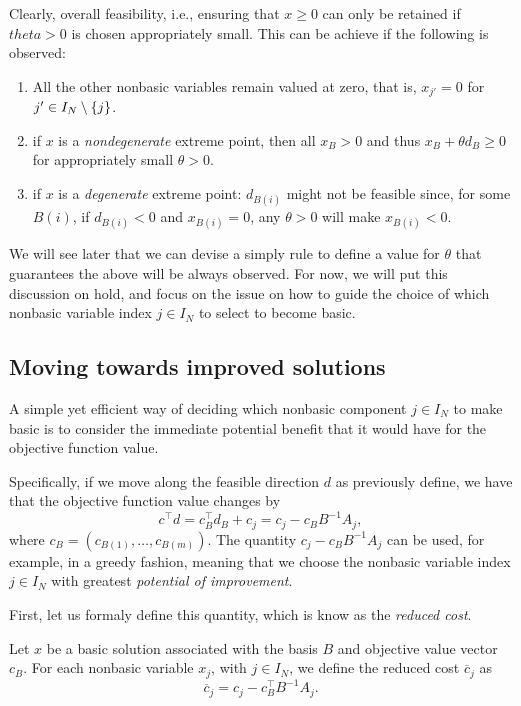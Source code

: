 Clearly, overall feasibility, i.e., ensuring that $x \ge 0$ can only be retained if $theta > 0$ is chosen appropriately small. This can be achieve if the following is observed:
%
\begin{enumerate}
	\item All the other nonbasic variables remain valued at zero, that is, $x_{j'} = 0$ for $j' \in I_N \setminus \left\{ j \right \}$.	
	\item if $x$ is a \emph{nondegenerate} extreme point, then all $x_B > 0$ and thus $x_B + \theta d_B \geq 0$ for appropriately small $\theta > 0$. 
	\item if $x$ is a \emph{degenerate} extreme point: $d_{B(i)}$ might not be feasible since, for some $B(i)$, if $d_{B(i)} < 0$ and $x_{B(i)} = 0$, any $\theta > 0$ will make $x_{B(i)} < 0$.
\end{enumerate}
%
We will see later that we can devise a simply rule to define a value for $\theta$ that guarantees the above will be always observed. For now, we will put this discussion on hold, and focus on the issue on how to guide the choice of which nonbasic variable index $j \in I_N$ to select to become basic.


\subsection{Moving towards improved solutions}

A simple yet efficient way of deciding which nonbasic component $j \in I_N$ to make basic is to consider the immediate potential benefit that it would have for the objective function value. 

Specifically, if we move along the feasible direction $d$ as previously define, we have that the objective function value changes by 
%
\begin{equation*}
	c^\top d = c_B^\top d_B + c_j = c_j - c_BB^{-1}A_j,
\end{equation*}
%
where $c_B = (c_{B(1)}, \dots, c_{B(m)})$. The quantity $c_j - c_BB^{-1}A_j$ can be used, for example, in a greedy fashion, meaning that we choose the nonbasic variable index $j \in I_N$ with greatest \emph{potential of improvement}.

First, let us formaly define this quantity, which is know as the \emph{reduced cost}. 

\begin{definition}
	Let $x$ be a basic solution associated with the basis $B$ and objective value vector $c_B$. For each nonbasic variable $x_j$, with $j \in I_N$, we define the reduced cost $\overline{c}_j$ as
	\begin{equation*}
		\overline{c}_j = c_j - c_B^\top B^{-1}A_j.
	\end{equation*}
\end{definition}

